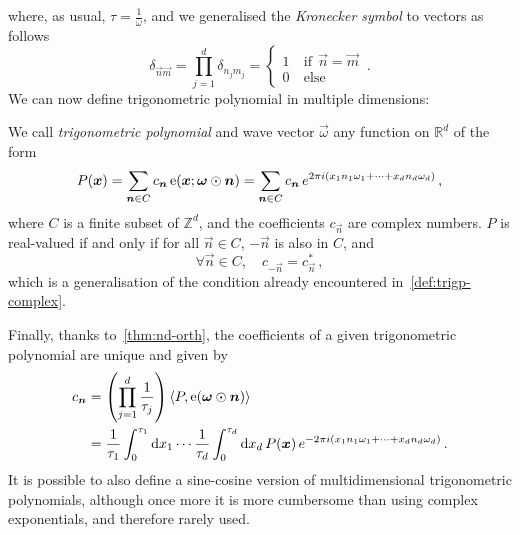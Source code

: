 where, as usual, $\tau=\frac{1}{\omega}$, and we generalised the \emph{Kronecker symbol}
to vectors as follows
\begin{equation}
  \delta_{\vec{n}\vec{m}}=\prod_{j=1}^{d}\delta_{n_jm_j}=
  \begin{cases}
    1&~\mathrm{if}~~\vec{n}=\vec{m}\\
    0&~\mathrm{else}
  \end{cases}\,.
\end{equation}
We can now define trigonometric polynomial in multiple dimensions:
\begin{definition}
  We call \emph{trigonometric polynomial} and wave vector $\vec{\omega}$ any function on
  $\mathbb{R}^d$ of the form
  \begin{equation}
    P(\bm{x})=\sum_{\bm{n}\in C}c_{\bm{n}}\operatorname{e}(\bm{x};\bm{\omega}\odot\bm{n})
    =\sum_{\bm{n}\in C}c_{\bm{n}}\,e^{2\pi i(x_1n_1\omega_1+\cdots+x_dn_d\omega_d)}\,,
  \end{equation}
  where $C$ is a finite subset of $\mathbb{Z}^d$, and the coefficients $c_{\vec{n}}$ are
  complex numbers. $P$ is real-valued if and only if for all $\vec{n}\in C$, $-\vec{n}$ is
  also in $C$, and
  \begin{equation}
    \forall\vec{n}\in C,\quad c_{-\vec{n}}=c_{\vec{n}}^*\,,
  \end{equation}
  which is a generalisation of the condition already encountered
  in~\cref{def:trigp-complex}.
\end{definition}
Finally, thanks to~\cref{thm:nd-orth}, the coefficients of a given trigonometric
polynomial are unique and given by
\begin{align}
  c_{\bm{n}}&=\left(\prod_{j=1}^{d}\frac{1}{\tau_j}\right)
  \braket{P,\operatorname{e}(\bm{\omega}\odot\bm{n})}\notag\\
  &=
  \frac{1}{\tau_1}\int_0^{\tau_1}\mathrm{d} x_1\cdots\frac{1}{\tau_d}\int_0^{\tau_d}\mathrm{d} x_d\,
  P(\bm{x})\,e^{-2\pi i(x_1n_1\omega_1+\cdots+x_dn_d\omega_d)}\,.
\end{align}
It is possible to also define a sine-cosine version of multidimensional trigonometric
polynomials, although once more it is more cumbersome than using complex exponentials, and
therefore rarely used.
